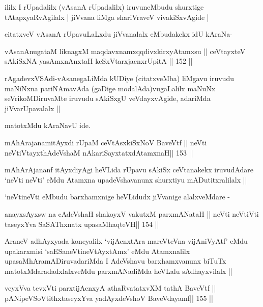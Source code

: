 \begin{artha}
ililx I rUpadalilx (vAsanA rUpadalilx) iruvuneMbudu shurxtige
tAtapxyaRvAgilalx | jiVvana liMga shariVraveV vivakiSxvAgide |

citatxveV vAsanA rUpavuLaLxdu jiVvanalalx eMbudakekx idU kAraNa-
\end{artha}

\begin{shl}
vAsanAnugataM liknagxM maqdavxnamxqqdivxkirxyAtamxsu ||
ceVtayxteV sAkiSxNA yasAmxnAnxtaH keSxVtarxjacnxrUpitA \hfill || 152 ||
\end{shl}

\begin{artha}
rAgadevxVSAdi-vAsanegaLiMda kUDiye (citatxveMba) liMgavu iruvudu
maNiNxna pariNAmavAda (gaDige modalAda)vugaLalilx maNuNx
seVrikoMDiruvaMte iruvudu sAkiSxgU veVdayxvAgide, adariMda
jiVvarUpavalalx ||

matotxMdu kAraNavU ide.
\end{artha}

\begin{shl}
mAhArajanamitAyxdi rUpaM ceVtAsxkiSxNoV BaveVtf ||
neVti neVtiVtayxthA\s\s deVshaM nAkariSayxtatxdA\s\s tamxnaH\hfill || 153 ||
\end{shl}

\begin{artha}
mAhArAjananf itAyxdiyAgi heVLida rUpavu sAkiSx ceVtanakekx iruvudAdare
`neVti neVti' eMdu Atamxna upadeVshavanunx shurxtiyu mADutitxralilalx
||

`neVtineVti eMbudu barxhamxnige heVLidudx jiVvanige alalxveMdare -
\end{artha}

\begin{shl}
anayxsAyxsw na cA\s\s deVshaH shakoyxV vakutxM parxmANataH ||
neVti neVtiVti taseyxYva SaSAThxnatx upasaMhaqteVH\hfill || 154 ||
\end{shl}

\begin{artha}
AraneV adhAyxyada koneyalilx `vijAcnxtAra mareVteVna vijAniVyAtf' eMdu
upakarxmisi `saESaneVtineVtAyxtAmx' eMdu Atamxnalilx
upasaMhAramADiruvadariMda I AdeVshavu barxhamxvanunx biTuTx
matotxMdaradadxlalxveMdu parxmANadiMda heVLalu sAdhayxvilalx ||
\end{artha}

\begin{shl}
veyxVva tevxVti parxtijAcnxyA athaRvatatxvXM tathA BaveVtf ||
pANipeVSoVtithxtaseyxYva yadAyxdeVshoV BaveVdayamf\hfill || 155 ||
\end{shl}

